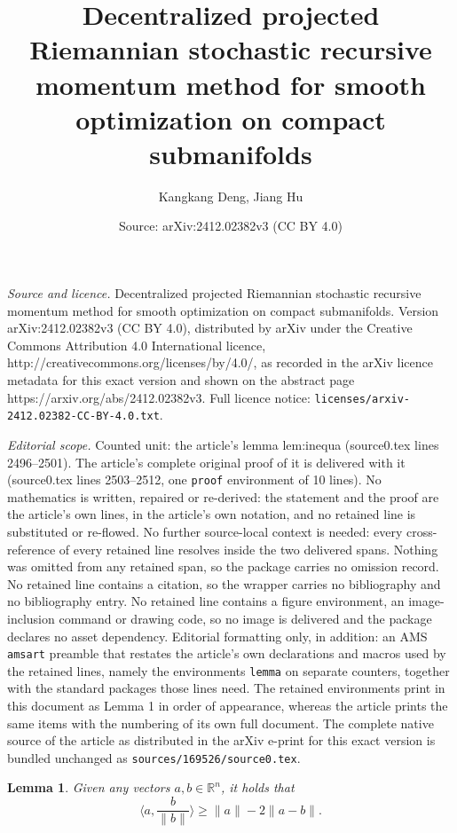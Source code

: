 \documentclass[10pt,a4paper]{amsart}
\title{Decentralized projected Riemannian stochastic recursive momentum method for smooth optimization on compact submanifolds}
\author{Kangkang Deng, Jiang Hu}
\date{Source: arXiv:2412.02382v3 (CC BY 4.0)}
\newtheorem{lemma}{Lemma}
\begin{document}
\maketitle

\noindent\emph{Source and licence.} Decentralized projected Riemannian stochastic recursive momentum method for smooth optimization on compact submanifolds. Version arXiv:2412.02382v3 (CC BY 4.0), distributed by arXiv under the Creative Commons Attribution 4.0 International licence, http://creativecommons.org/licenses/by/4.0/, as recorded in the arXiv licence metadata for this exact version and shown on the abstract page https://arxiv.org/abs/2412.02382v3. Full licence notice: \texttt{licenses/arxiv-2412.02382-CC-BY-4.0.txt}.\par\smallskip

\noindent\textit{Editorial scope.} Counted unit: the article's lemma lem:inequa (source0.tex lines 2496--2501). The article's complete original proof of it is delivered with it (source0.tex lines 2503--2512, one \texttt{proof} environment of 10 lines). No mathematics is written, repaired or re-derived: the statement and the proof are the article's own lines, in the article's own notation, and no retained line is substituted or re-flowed.  No further source-local context is needed: every cross-reference of every retained line resolves inside the two delivered spans.  Nothing was omitted from any retained span, so the package carries no omission record.  No retained line contains a citation, so the wrapper carries no bibliography and no bibliography entry.  No retained line contains a figure environment, an image-inclusion command or drawing code, so no image is delivered and the package declares no asset dependency.  Editorial formatting only, in addition: an AMS \texttt{amsart} preamble that restates the article's own declarations and macros used by the retained lines, namely the environments \texttt{lemma} on separate counters, together with the standard packages those lines need.  The retained environments print in this document as Lemma 1 in order of appearance, whereas the article prints the same items with the numbering of its own full document.  The complete native source of the article as distributed in the arXiv e-print for this exact version is bundled unchanged as \texttt{sources/169526/source0.tex}.
\begin{lemma}\label{lem:inequa}
    Given any vectors $a,b\in \mathbb{R}^n$, it holds that
    \begin{equation}
        \langle a, \frac{b}{\|b\|} \rangle \geq \|a\| - 2\|a - b\|.
    \end{equation}
\end{lemma}
\end{document}

